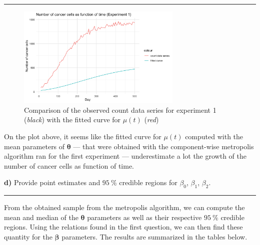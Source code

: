 \begin{center}\rule{6cm}{0.4pt}\end{center}

\begin{figure}[H]
	\centering
	\includegraphics[width=0.7\textwidth]{figures/metropolis_cw/metropolis_cw_fitted_curve.png}
	\caption{Comparison of the observed count data series for experiment 1 (\textit{black}) with the fitted curve for $\mu(t)$ (\textit{red})}
	\label{fig:metropolis-cv-fitted-curve}
\end{figure}

On the plot above, it seems like the fitted curve for $\mu(t)$ computed with the mean parameters of $\bm{\theta}$ --- that were obtained with the component-wise metropolis algorithm ran for the first experiment --- underestimate a lot the growth of the number of cancer cells as function of time.

\textbf{d)} Provide point estimates and $\SI{95}{\percent}$ credible regions for $\beta_0$, $\beta_1$, $\beta_2$.

\begin{center}\rule{6cm}{0.4pt}\end{center}

From the obtained sample from the metropolis algorithm, we can compute the mean and median of the $\bm{\theta}$ parameters as well as their respective $\SI{95}{\percent}$ credible regions.  Using the relations found in the first question, we can then find these quantity for the $\bm{\beta}$ parameters. The results are summarized in the tables below.


